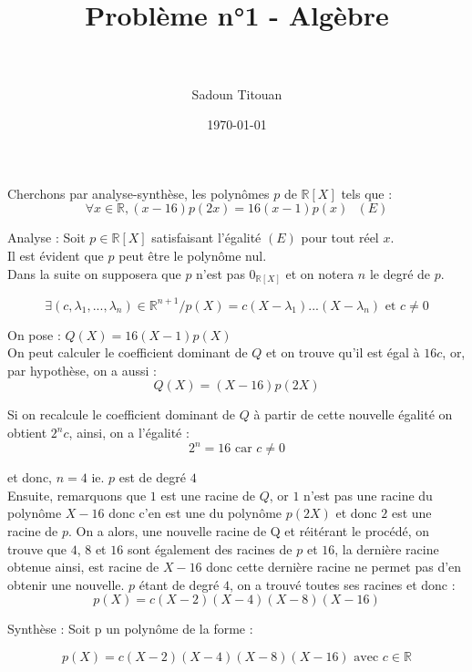 \documentclass[paper=a4, fontsize=11pt]{scrartcl} %
\title{	
\normalfont \normalsize 
\textsc{} \\ [25pt] %
\horrule{0.5pt} \\[0.4cm] %
\huge Problème n°1 - Algèbre\\ %
\horrule{2pt} \\[0.5cm] %
}
\author{Sadoun Titouan} %
\date{\normalsize\today} %
\numberwithin{equation}{section} %
\numberwithin{figure}{section} %
\numberwithin{table}{section} %
\begin{document}
\maketitle %


Cherchons par analyse-synthèse, les polynômes $p$ de $\mathbb{R}[X]$ tels que : $$\forall x \in \mathbb{R}, (x - 16)p(2x) = 16(x - 1)p(x) \text{     } (E)$$


Analyse : Soit $p \in \mathbb{R}[X]$ satisfaisant l'égalité $(E)$ pour tout réel $x$.\\

Il est évident que $p$ peut être le polynôme nul.\\

Dans la suite on supposera que $p$ n'est pas $0_{\mathbb{R}[X]}$ et on notera $n$ le degré de $p$.

$$\exists (c, \lambda_1, ..., \lambda_n) \in \mathbb{R}^{n+1}/ p(X)=c(X-\lambda_1)...(X - \lambda_n) \text{ et } c \neq 0$$

On pose : $Q(X) = 16(X - 1)p(X)$\\

On peut calculer le coefficient dominant de $Q$ et on trouve qu'il est égal à $16c$, or, par hypothèse, on a aussi : $$Q(X) = (X - 16)p(2X)$$

Si on recalcule le coefficient dominant de $Q$ à partir de cette nouvelle égalité on obtient $2^nc$, ainsi, on a l'égalité : $$2^n = 16\text{ car } c \neq 0$$

et donc, $n = 4$ ie. $p$ est de degré $4$\\

Ensuite, remarquons que $1$ est une racine de $Q$, or $1$ n'est pas une racine du polynôme $X - 16$ donc c'en est une du polynôme $p(2X)$ et donc $2$ est une racine de $p$. On a alors, une nouvelle racine de Q et réitérant le procédé, on trouve que $4$, $8$ et $16$ sont également des racines de $p$ et $16$, la dernière racine obtenue ainsi, est racine de $X - 16$ donc cette dernière racine ne permet pas d'en obtenir une nouvelle. $p$ étant de degré $4$, on a trouvé toutes ses racines et donc : $$p(X) = c(X-2)(X-4)(X-8)(X-16)$$

Synthèse : Soit p un polynôme de la forme :

$$p(X) = c(X-2)(X-4)(X-8)(X-16) \text{ avec } c \in \mathbb{R}$$
\end{document}
